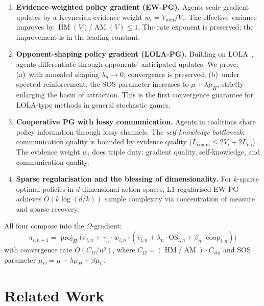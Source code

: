 \documentclass[a4paper,oneside,11pt]{report}
\DeclareMathOperator{\proj}{proj}
\begin{document}
\begin{enumerate}
    \item \textbf{Evidence-weighted policy gradient (EW-PG).} Agents scale gradient updates by a Keynesian evidence weight $w_i = V_{\min}/V_i$. The effective variance improves by $\operatorname{HM}(V)/\operatorname{AM}(V) \leq 1$. The rate exponent is preserved; the improvement is in the leading constant.

    \item \textbf{Opponent-shaping policy gradient (LOLA-PG).} Building on LOLA~\cite{foerster2018lola}, agents differentiate through opponents' anticipated updates. We prove: (a)~with annealed shaping $\lambda_n \to 0$, convergence is preserved; (b)~under spectral reinforcement, the SOS parameter increases to $\mu + \lambda\mu_H$, strictly enlarging the basin of attraction. This is the first convergence guarantee for LOLA-type methods in general stochastic games.

    \item \textbf{Cooperative PG with lossy communication.} Agents in coalitions share policy information through lossy channels. The \emph{self-knowledge bottleneck}: communication quality is bounded by evidence quality ($L_{\text{comm}} \leq 2V_i + 2L_{\text{ch}}$). The evidence weight $w_i$ does triple duty: gradient quality, self-knowledge, and communication quality.

    \item \textbf{Sparse regularisation and the blessing of dimensionality.} For $k$-sparse optimal policies in $d$-dimensional action spaces, L1-regularised EW-PG achieves $O(k \log(d/k))$ sample complexity via concentration of measure and sparse recovery.
\end{enumerate}

All four compose into the $\Omega$-gradient:
\begin{equation}
    \pi_{i,n+1} = \proj_\Pi\bigl(\pi_{i,n} + \gamma_n \cdot w_{i,n} \cdot (\hat{v}_{i,n} + \lambda_n \cdot \text{OS}_{i,n} + \beta_n \cdot \text{coop}_{i,n})\bigr)
\end{equation}
with convergence rate $O(C_\Omega / n^q)$, where $C_\Omega = (\operatorname{HM}/\operatorname{AM}) \cdot C_{\text{std}}$ and SOS parameter $\mu_\Omega = \mu + \lambda\mu_H + \beta\mu_C$.

\section{Related Work}
\end{document}
